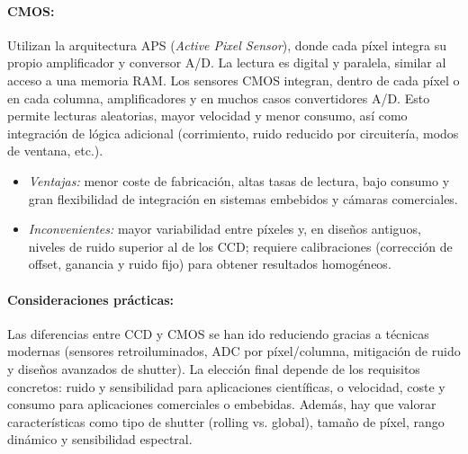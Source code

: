 \paragraph{CMOS:} Utilizan la arquitectura APS (\textit{Active Pixel Sensor}), donde cada píxel integra su propio amplificador y conversor A/D. La lectura es digital y paralela, similar al acceso a una memoria RAM.
Los sensores CMOS integran, dentro de cada píxel o en cada columna, amplificadores y en muchos casos convertidores A/D. Esto permite lecturas aleatorias, mayor velocidad y menor consumo, así como integración de lógica adicional (corrimiento, ruido reducido por circuitería, modos de ventana, etc.).
\begin{itemize}
    \item \emph{Ventajas:} menor coste de fabricación, altas tasas de lectura, bajo consumo y gran flexibilidad de integración en sistemas embebidos y cámaras comerciales.
    \item \emph{Inconvenientes:} mayor variabilidad entre píxeles y, en diseños antiguos, niveles de ruido superior al de los CCD; requiere calibraciones (corrección de offset, ganancia y ruido fijo) para obtener resultados homogéneos.
\end{itemize}

\paragraph{Consideraciones prácticas:}
Las diferencias entre CCD y CMOS se han ido reduciendo gracias a técnicas modernas (sensores retroiluminados, ADC por píxel/columna, mitigación de ruido y diseños avanzados de shutter). La elección final depende de los requisitos concretos: ruido y sensibilidad para aplicaciones científicas, o velocidad, coste y consumo para aplicaciones comerciales o embebidas. Además, hay que valorar características como tipo de shutter (rolling vs. global), tamaño de píxel, rango dinámico y sensibilidad espectral.

                
